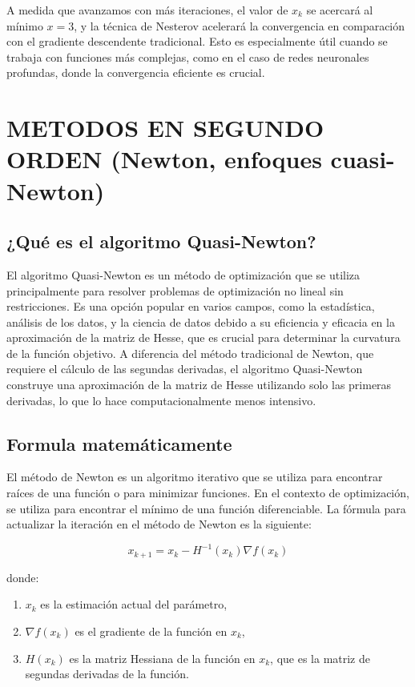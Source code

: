 \documentclass{article}
\begin{document}
	A medida que avanzamos con más iteraciones, el valor de \( x_k \) se acercará al mínimo \( x = 3 \), y la técnica de Nesterov acelerará la convergencia en comparación con el gradiente descendente tradicional. Esto es especialmente útil cuando se trabaja con funciones más complejas, como en el caso de redes neuronales profundas, donde la convergencia eficiente es crucial.
	
	\section{METODOS EN SEGUNDO ORDEN (Newton, enfoques cuasi-Newton)}
	
	\subsection{¿Qué es el algoritmo Quasi-Newton?}
	
	El algoritmo Quasi-Newton es un método de optimización que se utiliza principalmente para resolver problemas de optimización no lineal sin restricciones. Es una opción popular en varios campos, como la estadística, análisis de los datos, y la ciencia de datos debido a su eficiencia y eficacia en la aproximación de la matriz de Hesse, que es crucial para determinar la curvatura de la función objetivo. A diferencia del método tradicional de Newton, que requiere el cálculo de las segundas derivadas, el algoritmo Quasi-Newton construye una aproximación de la matriz de Hesse utilizando solo las primeras derivadas, lo que lo hace computacionalmente menos intensivo.
	
	\subsection{Formula matemáticamente}
	
	El método de Newton es un algoritmo iterativo que se utiliza para encontrar raíces de una función o para minimizar funciones. En el contexto de optimización, se utiliza para encontrar el mínimo de una función diferenciable. La fórmula para actualizar la iteración en el método de Newton es la siguiente:
	
	\[
	x_{k+1} = x_k - H^{-1}(x_k) \nabla f(x_k)
	\]
	
	donde:
	\begin{enumerate}
		\item \( x_k \) es la estimación actual del parámetro,
		\item \( \nabla f(x_k) \) es el gradiente de la función en \( x_k \),
		\item \( H(x_k) \) es la matriz Hessiana de la función en \( x_k \), que es la matriz de segundas derivadas de la función.
	\end{enumerate}
	
\end{document}
